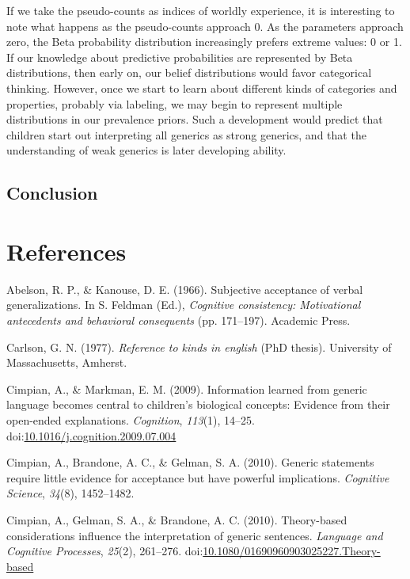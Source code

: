 \documentclass[floatsintext,man]{apa6}
\theoremstyle{definition}
\theoremstyle{definition}
\theoremstyle{definition}
\theoremstyle{remark}
\begin{document}
If we take the pseudo-counts as indices of worldly experience, it is
interesting to note what happens as the pseudo-counts approach 0. As the
parameters approach zero, the Beta probability distribution increasingly
prefers extreme values: 0 or 1. If our knowledge about predictive
probabilities are represented by Beta distributions, then early on, our
belief distributions would favor categorical thinking. However, once we
start to learn about different kinds of categories and properties,
probably via labeling, we may begin to represent multiple distributions
in our prevalence priors. Such a development would predict that children
start out interpreting all generics as strong generics, and that the
understanding of weak generics is later developing ability.

\subsection{Conclusion}\label{conclusion}

\section{References}\label{references}

\setlength{\parindent}{-0.5in} \setlength{\leftskip}{0.5in}

\hypertarget{refs}{}
\hypertarget{ref-Abelson1966}{}
Abelson, R. P., \& Kanouse, D. E. (1966). Subjective acceptance of
verbal generalizations. In S. Feldman (Ed.), \emph{Cognitive
consistency: Motivational antecedents and behavioral consequents} (pp.
171--197). Academic Press.

\hypertarget{ref-Carlson1977}{}
Carlson, G. N. (1977). \emph{Reference to kinds in english}
(PhD thesis). University of Massachusetts, Amherst.

\hypertarget{ref-Cimpian2009:explanations}{}
Cimpian, A., \& Markman, E. M. (2009). Information learned from generic
language becomes central to children's biological concepts: Evidence
from their open-ended explanations. \emph{Cognition}, \emph{113}(1),
14--25.
doi:\href{https://doi.org/10.1016/j.cognition.2009.07.004}{10.1016/j.cognition.2009.07.004}

\hypertarget{ref-Cimpian2010}{}
Cimpian, A., Brandone, A. C., \& Gelman, S. A. (2010). Generic
statements require little evidence for acceptance but have powerful
implications. \emph{Cognitive Science}, \emph{34}(8), 1452--1482.

\hypertarget{ref-Cimpian2010theory}{}
Cimpian, A., Gelman, S. A., \& Brandone, A. C. (2010). Theory-based
considerations influence the interpretation of generic sentences.
\emph{Language and Cognitive Processes}, \emph{25}(2), 261--276.
doi:\href{https://doi.org/10.1080/01690960903025227.Theory-based}{10.1080/01690960903025227.Theory-based}
\end{document}
